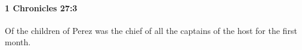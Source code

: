 
		\paragraph{1 Chronicles 27:3} %
			\label{1CHRONICLES-27-3}

			Of the children of Perez was the chief of all the captains of the host for the first month.


